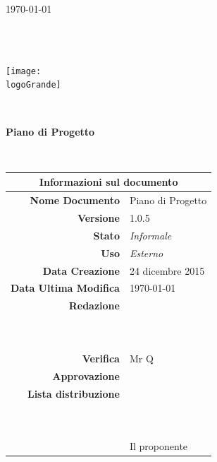 \documentclass[12pt,a4paper]{article}
\title{\titoloDocumento}
\newcommand{\titoloDocumento}{Piano di Progetto}
\newcommand{\dataCreazione}{24 dicembre 2015}
\newcommand{\versione}{1.0.5}
\newcommand{\stato}{Informale}
\newcommand{\uso}{Esterno}
\begin{document}
\begin{titlepage}
\begin{center}
\today \\
\vspace{1cm}
\begin{Huge}
\textbf{\nomeGruppo} \\
\end{Huge}
\textbf{\prjL} \\
\vspace{1cm}
\texttt{[image: \\logoGrande]}
\vspace{1cm}

\HRule \\[0.4cm]
\begin{Huge}
{\huge \bfseries \titoloDocumento}\\[0.4cm]
\end{Huge}
\HRule \\[1cm]
\vfill

\begin{table}[h]
\begin{center}
\begin{tabular}{r | l}
\multicolumn{2}{c}{\textbf{Informazioni sul documento}}\\
\midrule
\textbf{Nome Documento}	&	\titoloDocumento	\\
\textbf{Versione}	&	\versione	\\
\textbf{Stato}	&	\emph{\stato}	\\
\textbf{Uso}	&	\emph{\uso}	\\
\textbf{Data Creazione}	&	\dataCreazione	\\
\textbf{Data Ultima Modifica}	&	\today	\\
\textbf{Redazione}	& \NDC \\
\ 	& \TP \\
\ 	& \IB \\
\textbf{Verifica}	&	Mr Q	\\
\textbf{Approvazione}	& \NDC \\
\textbf{Lista distribuzione}	&	\nomeGruppo	\\
\ 	&	\Vardanega	\\
\ 	&	\Cardin	\\
\ 	&	Il proponente \Zucchetti	\\

\end{tabular}
\end{center}
\end{table}

\end{center}
\end{titlepage}
\newpage
\end{document}
